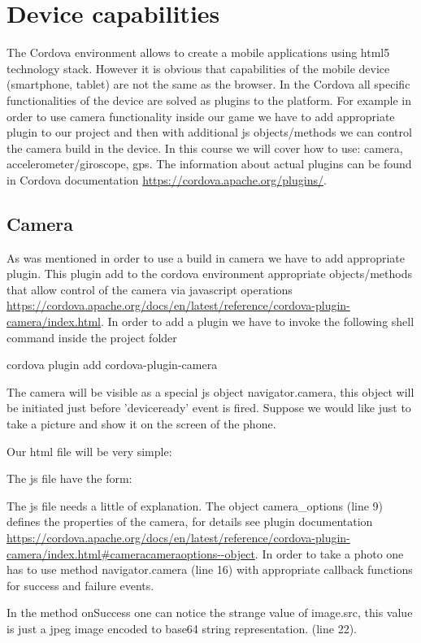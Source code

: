 \chapter{Device capabilities}

The Cordova environment allows to create a mobile applications using html5 technology stack. However it is obvious that capabilities of the mobile device (smartphone, tablet) are not the same as the browser. In the Cordova all specific functionalities of the device are solved as plugins to the platform. For example in order to use camera functionality inside our game we have to add appropriate plugin to our project and then with additional js objects/methods we can control the camera build in the device. In this course we will cover how to use: camera, accelerometer/giroscope, gps. The information about actual plugins can be found in Cordova documentation \url{https://cordova.apache.org/plugins/}.

\section{Camera}
As was mentioned in order to use a build in camera we have to add appropriate plugin. This plugin add to the cordova environment appropriate objects/methods that allow control of the camera via javascript operations \url{https://cordova.apache.org/docs/en/latest/reference/cordova-plugin-camera/index.html}. In order to add a plugin we have to invoke the following shell command inside the project folder

\begin{shell}
cordova plugin add cordova-plugin-camera
\end{shell}  

The camera will be visible as a special js object navigator.camera, this object will be initiated just before 'deviceready' event is fired. Suppose we would like just to take a picture and show it on the screen of the phone. 

Our html file will be very simple:


The js file have the form:


\begin{explain}
  The js file needs a little of explanation.
  The object camera\_options (line 9) defines the properties of the camera, for details see plugin documentation \url{https://cordova.apache.org/docs/en/latest/reference/cordova-plugin-camera/index.html#cameracameraoptions--object}. In order to take a photo one has to use method navigator.camera (line 16) with appropriate callback functions for success and failure events. 
  
  In the method onSuccess one can notice the strange value of image.src, this value is just a jpeg image encoded to base64 string representation. (line 22).
  
\end{explain}
